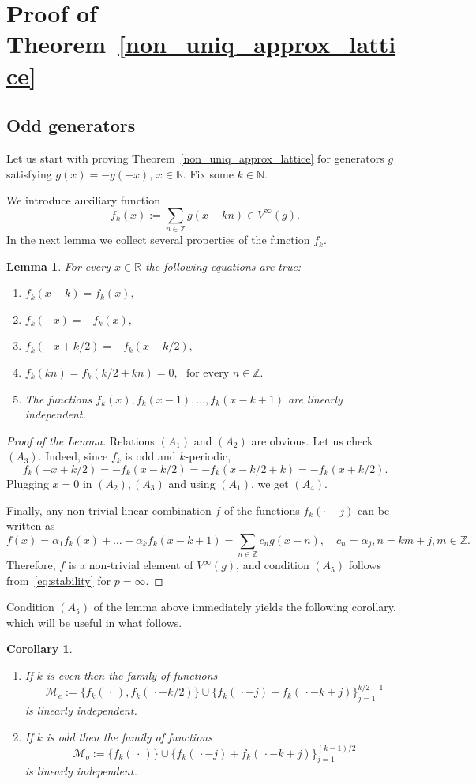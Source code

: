 \documentclass[10pt,a4paper]{amsart}
\numberwithin{equation}{section}
\newtheorem{lemma}[theorem]{Lemma}
\newtheorem{corollary}[theorem]{Corollary} \newcommand{\La}{\Lambda}
\newcommand{\R}{{\mathbb R}} \newcommand{\Q}{{\mathbb Q}} \newcommand{\Z}{{\mathbb Z}} \newcommand{\N}{{\mathbb N}}
\begin{document}
\section{Proof of Theorem~\ref{non_uniq_approx_lattice}}
\subsection{Odd generators}

Let us start with proving Theorem~\ref{non_uniq_approx_lattice} for generators $g$ satisfying $g(x)=-g(-x), \, x\in \R.  $ 
Fix some $k\in \N.$

We introduce auxiliary function
$$f_k(x):=\sum_{n\in\Z}g(x-kn)\in V^\infty(g).$$
In the next lemma we collect several properties of the function $f_k$.  

\begin{lemma}\label{lem:f_k_properties}
    For every $x\in \R$ the following equations are true:
\begin{enumerate}
    \item[$(A_1)$]  $f_k(x+k) = f_k(x),$
    \item[$(A_2)$] $ f_k(-x)=-f_k(x),$
    \item[$(A_3)$] $f_k(-x+k/2)= -f_k(x+k/2),$
    \item[$(A_4)$] $f_k(kn)=f_k(k/2+kn)=0, \, \, \text{ for every }n\in\Z.$
    \item[$(A_5)$] The functions $f_k(x), f_k(x-1),\dots,f_k(x-k+1)$ are linearly independent.
\end{enumerate}
\end{lemma}
\begin{proof}[Proof of the Lemma]
Relations $(A_1)$ and $(A_2)$ are obvious.
   Let us check $(A_3)$. Indeed, since $f_k$ is odd and $k$-periodic, 
$$f_k(-x+k/2)=-f_k(x-k/2)=-f_k(x-k/2+k)=-f_k(x+k/2).$$ Plugging $x = 0$ in $(A_2),(A_3)$ and using $(A_1)$, we get $(A_4).$ 

Finally, any non-trivial linear combination $f$ of the functions $f_k(\cdot-j)$ can be written as
$$f(x)=\alpha_1f_k(x)+\dots+\alpha_kf_k(x-k+1)=\sum_{n\in\Z}c_ng(x-n),\quad c_n=\alpha_j, n=km+j, m\in\Z.$$Therefore,  $f$ is a non-trivial element of $V^\infty(g)$, and 
condition $(A_5)$ follows from~\eqref{eq:stability} for $p=\infty$.
\end{proof}



Condition $(A_5)$ of the lemma above immediately yields the following corollary, which will be useful in what follows.
\begin{corollary}\label{claim:linear_indep}
\begin{enumerate} 
    \item[$(i)$] If $k$ is even then the family of functions
$$\mathcal{M}_e:=\{f_{k}(\,\cdot\,),f_k( \,\cdot-k/2)\}\cup\{f_k(\,\cdot-j)+f_k(\,\cdot-k+j)\}_{j=1}^{k/2-1}$$
is linearly independent.
    \item[$(ii)$]  If $k$ is odd then the family of functions
$$\mathcal{M}_o:=\{f_{k}(\,\cdot\,)\}\cup\{f_k(\,\cdot-j)+f_k(\,\cdot-k+j)\}_{j=1}^{(k-1)/2}$$
is linearly independent.
\end{enumerate}
\end{corollary}
\end{document}
